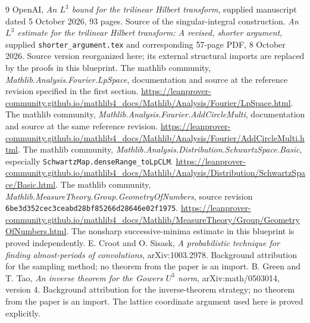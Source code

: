 \documentclass[11pt]{article}
\theoremstyle{definition}
\numberwithin{equation}{section}
\begin{document}
\begin{thebibliography}{9}
 OpenAI, \emph{An $L^3$ bound for the trilinear Hilbert transform}, supplied manuscript dated 5 October 2026, 93 pages. Source of the singular-integral construction.
 \emph{An $L^3$ estimate for the trilinear Hilbert transform: A revised, shorter argument}, supplied \nolinkurl{shorter_argument.tex} and corresponding 57-page PDF, 8 October 2026. Source version reorganized here; its external structural imports are replaced by the proofs in this blueprint.
 The mathlib community, \emph{Mathlib.Analysis.Fourier.LpSpace}, documentation and source at the reference revision specified in the first section. \url{https://leanprover-community.github.io/mathlib4_docs/Mathlib/Analysis/Fourier/LpSpace.html}.
 The mathlib community, \emph{Mathlib.Analysis.Fourier.AddCircleMulti}, documentation and source at the same reference revision. \url{https://leanprover-community.github.io/mathlib4_docs/Mathlib/Analysis/Fourier/AddCircleMulti.html}.
 The mathlib community, \emph{Mathlib.Analysis.Distribution.SchwartzSpace.Basic}, especially \nolinkurl{SchwartzMap.denseRange_toLpCLM}. \url{https://leanprover-community.github.io/mathlib4_docs/Mathlib/Analysis/Distribution/SchwartzSpace/Basic.html}.
 The mathlib community, \emph{Mathlib.MeasureTheory.Group.GeometryOfNumbers}, source revision \texttt{6be3d352cec3ceabd28bf85266d28646e02f1975}. \url{https://leanprover-community.github.io/mathlib4_docs/Mathlib/MeasureTheory/Group/GeometryOfNumbers.html}. The nonsharp successive-minima estimate in this blueprint is proved independently.
 E. Croot and O. Sisask, \emph{A probabilistic technique for finding almost-periods of convolutions}, arXiv:1003.2978. Background attribution for the sampling method; no theorem from the paper is an import.
 B. Green and T. Tao, \emph{An inverse theorem for the Gowers $U^3$ norm}, arXiv:math/0503014, version 4. Background attribution for the inverse-theorem strategy; no theorem from the paper is an import. The lattice coordinate argument used here is proved explicitly.
\end{thebibliography}
\end{document}
